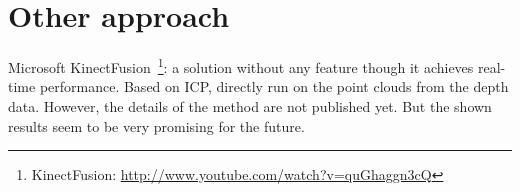 \section{Other approach}

Microsoft KinectFusion~\cite{MSFusion}\footnote{KinectFusion: \url{http://www.youtube.com/watch?v=quGhaggn3cQ}}: a solution without any feature though it achieves real-time performance. Based on ICP, directly run on the point clouds from the depth data. However, the details of the method are not published yet. But the shown results seem to be very promising for the future.



